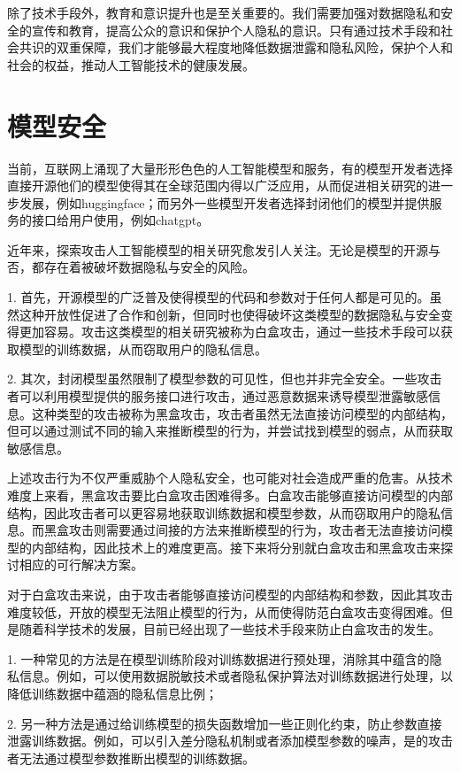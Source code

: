 除了技术手段外，教育和意识提升也是至关重要的。我们需要加强对数据隐私和安全的宣传和教育，提高公众的意识和保护个人隐私的意识。只有通过技术手段和社会共识的双重保障，我们才能够最大程度地降低数据泄露和隐私风险，保护个人和社会的权益，推动人工智能技术的健康发展。

\section{模型安全}

当前，互联网上涌现了大量形形色色的人工智能模型和服务，有的模型开发者选择直接开源他们的模型使得其在全球范围内得以广泛应用，从而促进相关研究的进一步发展，例如huggingface；而另外一些模型开发者选择封闭他们的模型并提供服务的接口给用户使用，例如chatgpt。

近年来，探索攻击人工智能模型的相关研究愈发引人关注。无论是模型的开源与否，都存在着被破坏数据隐私与安全的风险。

1. 首先，开源模型的广泛普及使得模型的代码和参数对于任何人都是可见的。虽然这种开放性促进了合作和创新，但同时也使得破坏这类模型的数据隐私与安全变得更加容易。攻击这类模型的相关研究被称为白盒攻击，通过一些技术手段可以获取模型的训练数据，从而窃取用户的隐私信息。

2. 其次，封闭模型虽然限制了模型参数的可见性，但也并非完全安全。一些攻击者可以利用模型提供的服务接口进行攻击，通过恶意数据来诱导模型泄露敏感信息。这种类型的攻击被称为黑盒攻击，攻击者虽然无法直接访问模型的内部结构，但可以通过测试不同的输入来推断模型的行为，并尝试找到模型的弱点，从而获取敏感信息。

上述攻击行为不仅严重威胁个人隐私安全，也可能对社会造成严重的危害。从技术难度上来看，黑盒攻击要比白盒攻击困难得多。白盒攻击能够直接访问模型的内部结构，因此攻击者可以更容易地获取训练数据和模型参数，从而窃取用户的隐私信息。而黑盒攻击则需要通过间接的方法来推断模型的行为，攻击者无法直接访问模型的内部结构，因此技术上的难度更高。接下来将分别就白盒攻击和黑盒攻击来探讨相应的可行解决方案。

对于白盒攻击来说，由于攻击者能够直接访问模型的内部结构和参数，因此其攻击难度较低，开放的模型无法阻止模型的行为，从而使得防范白盒攻击变得困难。但是随着科学技术的发展，目前已经出现了一些技术手段来防止白盒攻击的发生。

1. 一种常见的方法是在模型训练阶段对训练数据进行预处理，消除其中蕴含的隐私信息。例如，可以使用数据脱敏技术或者隐私保护算法对训练数据进行处理，以降低训练数据中蕴涵的隐私信息比例；

2. 另一种方法是通过给训练模型的损失函数增加一些正则化约束，防止参数直接泄露训练数据。例如，可以引入差分隐私机制或者添加模型参数的噪声，是的攻击者无法通过模型参数推断出模型的训练数据。

